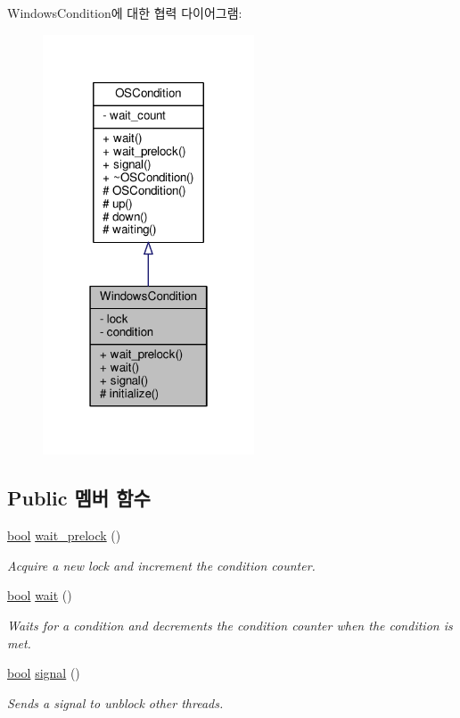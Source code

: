 Windows\+Condition에 대한 협력 다이어그램\+:
\nopagebreak
\begin{figure}[H]
\begin{center}
\leavevmode
\includegraphics[width=178pt]{class_windows_condition__coll__graph}
\end{center}
\end{figure}
\subsection*{Public 멤버 함수}
\begin{DoxyCompactItemize}
\item 
\hyperlink{avb__gptp_8h_af6a258d8f3ee5206d682d799316314b1}{bool} \hyperlink{class_windows_condition_aafecb1736d263490a10105a79054db38}{wait\+\_\+prelock} ()
\begin{DoxyCompactList}\small\item\em Acquire a new lock and increment the condition counter. \end{DoxyCompactList}\item 
\hyperlink{avb__gptp_8h_af6a258d8f3ee5206d682d799316314b1}{bool} \hyperlink{class_windows_condition_ab86f338cf229c8dd15d854493ff43ff6}{wait} ()
\begin{DoxyCompactList}\small\item\em Waits for a condition and decrements the condition counter when the condition is met. \end{DoxyCompactList}\item 
\hyperlink{avb__gptp_8h_af6a258d8f3ee5206d682d799316314b1}{bool} \hyperlink{class_windows_condition_a15d354e10ad83f2f71f2bd21aecd04ec}{signal} ()
\begin{DoxyCompactList}\small\item\em Sends a signal to unblock other threads. \end{DoxyCompactList}\end{DoxyCompactItemize}
